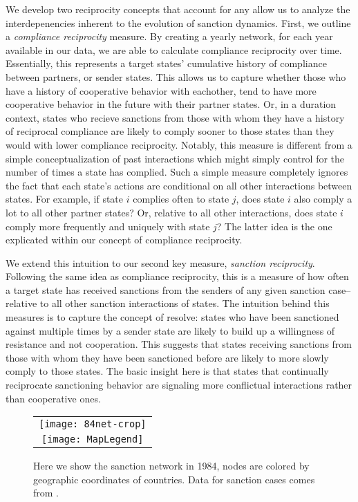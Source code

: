 We develop two reciprocity concepts that account for any allow us to analyze the interdepenencies inherent to the evolution of sanction dynamics. First, we outline a \textit{compliance reciprocity} measure. By creating a yearly network, for each year available in our data, we are able to calculate compliance reciprocity over time. Essentially, this represents a target states' cumulative history of compliance between partners, or sender states. This allows us to capture whether those who have a history of cooperative behavior with eachother, tend to have more cooperative behavior in the future with their partner states. Or, in a duration context, states who recieve sanctions from those with whom they have a history of reciprocal compliance are likely to comply sooner to those states than they would with lower compliance reciprocity. Notably, this measure is different from a simple conceptualization of past interactions which might simply control for the number of times a state has complied. Such a simple measure completely ignores the fact that each state's actions are conditional on all other interactions between states. For example, if state $i$ complies often to state $j$, does state $i$ also comply a lot to all other partner states? Or, relative to all other interactions, does state $i$ comply more frequently and uniquely with state $j$? The latter idea is the one explicated within our  concept of compliance reciprocity. 

We extend this intuition to our second key measure, \textit{sanction reciprocity}. Following the same idea as compliance reciprocity, this is a measure of how often a target state has received sanctions from the senders of any given sanction case--relative to all other sanction interactions of states. The intuition behind this measures is to capture the concept of resolve: states who have been sanctioned against multiple times by a sender state are likely to build up a willingness of resistance and not cooperation.  This suggests that states receiving sanctions from those with whom they have been sanctioned before are likely to more slowly comply to those states. The basic insight here is that states that continually reciprocate sanctioning behavior are signaling more conflictual interactions rather than cooperative ones. 


\begin{figure}[ht]
  \centering
  \begin{tabular}{c}
	  \texttt{[image: 84net-crop]} \\
	  \texttt{[image: MapLegend]}
  \end{tabular}
  \caption{Here we show the sanction network in 1984, nodes are colored by geographic coordinates of countries. Data for sanction cases comes from \citet{morgan2009threat}.}
  \label{fig:spaghetti}
\end{figure}
\FloatBarrier

